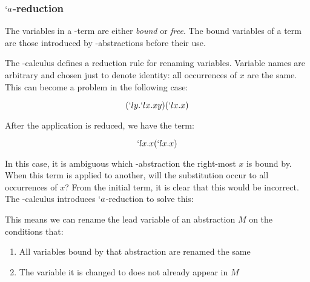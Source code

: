 \subsubsection{$`a$-reduction}
 
  The variables in a \lam-term are either \emph{bound} or \emph{free}. 
  The bound variables of a term are those introduced by \lam-abstractions before their use.
 
 
  The \lam-calculus defines a reduction rule for renaming variables.
  Variable names are arbitrary and chosen just to denote identity:
  all occurrences of $x$ are the same. This can become a problem
  in the following case:
  
  \[
    (`ly.`lx.xy)(`lx.x)
  \]
 
  After the application is reduced, we have the term:
  
  \[
    `lx.x(`lx.x) 
  \]
  
  In this case, it is ambiguous which \lam-abstraction the right-most $x$
  is bound by. When this term is applied to another, will the substitution
  occur to all occurrences of $x$? From the initial term, it is clear that
  this would be incorrect. The \lam-calculus introduces $`a$-reduction to
  solve this:
  
  \begin{figure}[!h]\label{def:alpha-reduction}
  \end{figure}
 
  This means we can rename the lead variable of an abstraction $M$ on the 
  conditions that: 
  \begin{enumerate}
    \item All variables bound by that abstraction are renamed the same 
    \item The variable it is changed to does not already appear in $M$ 
  \end{enumerate}
  
